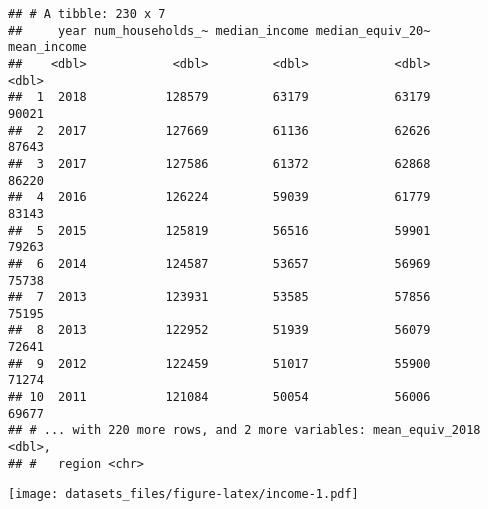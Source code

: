 \documentclass[]{article}
\newenvironment{Shaded}{\begin{snugshade}}{\end{snugshade}}
\newcommand{\DataTypeTok}[1]{\textcolor[rgb]{0.13,0.29,0.53}{#1}}
\newcommand{\DecValTok}[1]{\textcolor[rgb]{0.00,0.00,0.81}{#1}}
\newcommand{\KeywordTok}[1]{\textcolor[rgb]{0.13,0.29,0.53}{\textbf{#1}}}
\newcommand{\NormalTok}[1]{#1}
\newcommand{\OperatorTok}[1]{\textcolor[rgb]{0.81,0.36,0.00}{\textbf{#1}}}
\newcommand{\OtherTok}[1]{\textcolor[rgb]{0.56,0.35,0.01}{#1}}
\newcommand{\StringTok}[1]{\textcolor[rgb]{0.31,0.60,0.02}{#1}}
\begin{document}
\begin{verbatim}
## # A tibble: 230 x 7
##     year num_households_~ median_income median_equiv_20~ mean_income
##    <dbl>            <dbl>         <dbl>            <dbl>       <dbl>
##  1  2018           128579         63179            63179       90021
##  2  2017           127669         61136            62626       87643
##  3  2017           127586         61372            62868       86220
##  4  2016           126224         59039            61779       83143
##  5  2015           125819         56516            59901       79263
##  6  2014           124587         53657            56969       75738
##  7  2013           123931         53585            57856       75195
##  8  2013           122952         51939            56079       72641
##  9  2012           122459         51017            55900       71274
## 10  2011           121084         50054            56006       69677
## # ... with 220 more rows, and 2 more variables: mean_equiv_2018 <dbl>,
## #   region <chr>
\end{verbatim}

\begin{Shaded}
\end{Shaded}

\texttt{[image: datasets\_files/figure-latex/income-1.pdf]}
\end{document}

